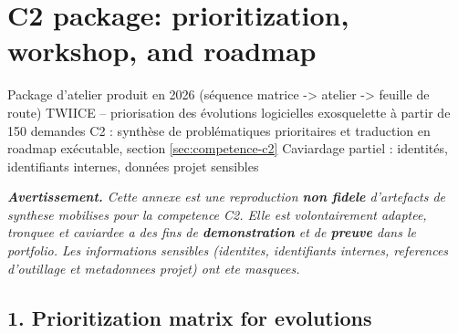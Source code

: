 
\chapter{C2 package: prioritization, workshop, and roadmap}
\label{annex:c2-priorisation}

\annexefiche
  {Package d'atelier produit en 2026 (séquence matrice -> atelier -> feuille de route)}
  {TWIICE -- priorisation des évolutions logicielles exosquelette à partir de 150 demandes}
  {C2 : synthèse de problématiques prioritaires et traduction en roadmap exécutable, section \ref{sec:competence-c2}}
  {Caviardage partiel : identités, identifiants internes, données projet sensibles}

\begin{tcolorbox}[colback=blue!5, colframe=blue!40!black, boxrule=0.5pt, arc=3pt,
  left=8pt, right=8pt, top=6pt, bottom=6pt]
  \small\itshape
  \textbf{Avertissement.} Cette annexe est une reproduction \textbf{non fidele} d'artefacts de synthese mobilises pour la competence C2. Elle est volontairement adaptee, tronquee et caviardee a des fins de \textbf{demonstration} et de \textbf{preuve} dans le portfolio. Les informations sensibles (identites, identifiants internes, references d'outillage et metadonnees projet) ont ete masquees.
\end{tcolorbox}

\section*{1. Prioritization matrix for evolutions}
\label{annex:c2-matrice}

